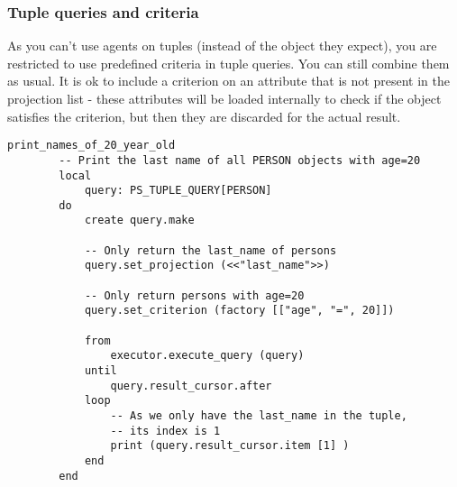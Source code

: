 \subsubsection{Tuple queries and criteria}
As you can't use agents on tuples (instead of the object they expect), you are restricted to use predefined criteria in tuple queries. You can still combine them as usual.
It is ok to include a criterion on an attribute that is not present in the projection list - these attributes will be loaded internally to check if the object satisfies the criterion, but then they are discarded for the actual result.

\begin{lstlisting}[language=OOSC2Eiffel, captionpos=b, caption={}, label={lst:tuple_projection_selection}]
	print_names_of_20_year_old
		-- Print the last name of all PERSON objects with age=20
		local
			query: PS_TUPLE_QUERY[PERSON]
		do
			create query.make

			-- Only return the last_name of persons
			query.set_projection (<<"last_name">>)

			-- Only return persons with age=20
			query.set_criterion (factory [["age", "=", 20]])

			from
				executor.execute_query (query)
			until
				query.result_cursor.after
			loop
				-- As we only have the last_name in the tuple,
				-- its index is 1
				print (query.result_cursor.item [1] )
			end			
		end
\end{lstlisting}








